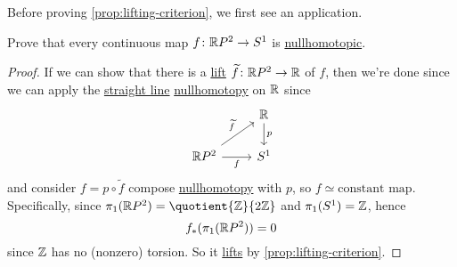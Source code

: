 Before proving \autoref{prop:lifting-criterion}, we first see an application.
\begin{eg}
	Prove that every continuous map \(f\colon \mathbb{\MakeUppercase{r}} P^{2}\to S^1\) is \hyperref[def:nullhomotopic]{nullhomotopic}.
	\begin{proof}
		If we can show that there is a \hyperref[prop:homotopy-lifting-property]{lift} \(\widetilde{f} \colon \mathbb{\MakeUppercase{r}} P^{2}\to \mathbb{\MakeUppercase{r}}\) of \(f\),
		then we're done since we can apply the \hyperref[eg:lec1:straight-line-homotopy]{straight line} \hyperref[def:nullhomotopic]{nullhomotopy}
		on \(\mathbb{\MakeUppercase{r}} \) since
		\[\begin{tikzcd}
				& {\mathbb{R}} \\
				{\mathbb{R}P^2} & {S^1}
				\arrow["f"', from=2-1, to=2-2]
				\arrow["{\widetilde{f}}", from=2-1, to=1-2]
				\arrow["p", from=1-2, to=2-2]
			\end{tikzcd}\]
		and consider \(f = p \circ \widetilde{f} \) compose \hyperref[def:nullhomotopic]{nullhomotopy} with \(p\), so \(f\simeq \text{constant map} \).
		Specifically, since \(\pi _1(\mathbb{\MakeUppercase{r}} P^{2}) = \quotient{\mathbb{\MakeUppercase{z}}}{2 \mathbb{\MakeUppercase{z}}}\) and
		\(\pi _1(S^1) = \mathbb{\MakeUppercase{z}} \), hence
		\[
			f_\ast (\pi _1(\mathbb{\MakeUppercase{r}} P^{2} )) = 0
		\]
		since \(\mathbb{\MakeUppercase{z}} \) has no (nonzero) torsion. So it \hyperref[prop:homotopy-lifting-property]{lifts} by
		\autoref{prop:lifting-criterion}.
	\end{proof}
\end{eg}

